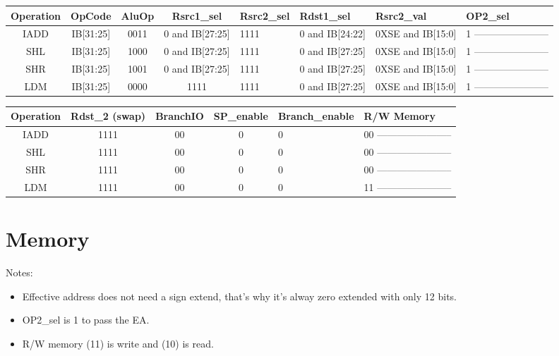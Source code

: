 \documentclass[12pt]{report}
\begin{document}
    \begin{center}
    \begin{tabular}{||c| c| c| c| p{40mm}||} 
    \hline
    Operation & OpCode & AluOp & Rsrc1_sel & Rsrc2_sel & Rdst1_sel & Rsrc2_val & OP2_sel  \\ [0.5ex] 
    \hline\hline
    IADD& IB[31:25] & 0011 & 0 and IB[27:25] & 1111 & 0 and IB[24:22] & 0XSE and IB[15:0] & 1 ----------------------- \\
    \hline
    SHL & IB[31:25] & 1000 & 0 and IB[27:25] & 1111 & 0 and IB[27:25] & 0XSE and IB[15:0] & 1 ----------------------- \\
    \hline
    SHR & IB[31:25] & 1001 & 0 and IB[27:25] & 1111 & 0 and IB[27:25] & 0XSE and IB[15:0] & 1 ----------------------- \\
    \hline
    LDM & IB[31:25] & 0000 & 1111 & 1111 & 0 and IB[27:25] & 0XSE and IB[15:0] & 1 ----------------------- \\
    \hline

    \end{tabular}
    \end{center}

    \begin{center}
    \begin{tabular}{||c| c| c| c| p{40mm}||} 
    \hline
    Operation & Rdst_2 (swap) & BranchIO & SP_enable & Branch_enable & R/W Memory  \\ [0.5ex] 
    \hline\hline
    IADD & 1111 & 00 & 0 & 0 & 00 ----------------------- \\
    \hline
    SHL & 1111 & 00 & 0 & 0 & 00 ----------------------- \\
    \hline
    SHR & 1111 & 00 & 0 & 0 & 00 ----------------------- \\
    \hline
    LDM & 1111 & 00 & 0 & 0 & 11 ----------------------- \\
    \hline

    \end{tabular}
    \end{center}



    \section{Memory}
    \item Notes:
    \begin{itemize}
        \item Effective address does not need a sign extend, that's why it's alway zero extended with only 12 bits.
        \item OP2_sel is 1 to pass the EA.
        \item R/W memory (11) is write and (10) is read.
    \end{itemize}
\end{document}
